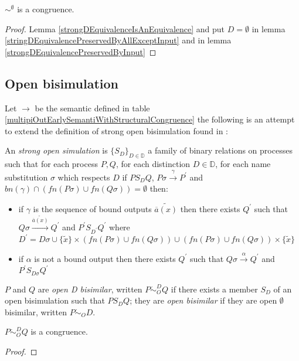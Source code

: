 \begin{theorem}
  $\sim^{\emptyset}$ is a congruence.
  \begin{proof}
    Lemma \ref{strongDEquivalenceIsAnEquivalence} and put $D=\emptyset$ in lemma \ref{stringDEquivalencePreservedByAllExceptInput} and in lemma \ref{strongDEquivalencePreservedByInput}
  \end{proof}
\end{theorem}


\subsection{Open bisimulation}


Let $\rightarrow$ be the semantic defined in table \ref{multipiOutEarlySemantiWithStructuralCongruence} the following is an attempt to extend the definition of strong open bisimulation found in \cite{parrow}:
\begin{definition}
  An \emph{strong open simulation} is $\{S_{D}\}_{D\in \mathbb{D}}$ a family of binary relations on processes such that for each process $P, Q$, for each distinction $D\in \mathbb{D}$, for each name substitution $\sigma$ which respects $D$ if $P S_{D} Q$, $P\sigma \xrightarrow{\gamma} P^{'}$ and $bn(\gamma)\cap (fn(P\sigma)\cup fn(Q\sigma))=\emptyset$ then:
   \begin{itemize}
    \item 
      if $\gamma$ is the sequence of bound outputs $\widetilde{\overline{a}(x)}$ then there exists $Q^{'}$ such that $Q\sigma \xrightarrow{\widetilde{\overline{a}(x)}} Q^{'}$ and $P^{'} S_{D^{'}} Q^{'}$ where $D^{'}=D\sigma \cup \{\tilde{x}\}\times (fn(P\sigma)\cup fn(Q\sigma)) \cup  (fn(P\sigma)\cup fn(Q\sigma))\times\{\tilde{x}\}$
    \item
      if $\alpha$ is not a bound output then there exists $Q^{'}$ such that $Q\sigma \xrightarrow{\alpha} Q^{'}$ and $P^{'} S_{D\sigma} Q^{'}$
  \end{itemize}
  $P$ and $Q$ are \emph{open D bisimilar}, written $P \dot{\sim}_{O}^{D} Q$ if there exists a member $S_{D}$ of an open bisimulation such that $P S_{D} Q$; they are \emph{open bisimilar} if they are open $\emptyset$ bisimilar, written $P \dot{\sim}_{O} D$.
\end{definition}

\begin{theorem}
  $P \dot{\sim}_{O}^{D} Q$ is a congruence.
  \begin{proof}
    
  \end{proof}
\end{theorem}
